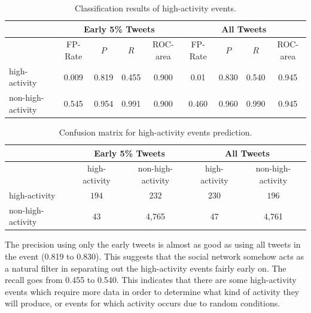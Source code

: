 \begin{table}
  \centering
  {\small
    \begin{tabularx}{\textwidth}{lcccc|cccc}
      \toprule
      & \multicolumn{4}{c}{\textbf{Early 5\% Tweets}} & \multicolumn{4}{c}{\textbf{All Tweets}} \\
      \midrule
      & FP-Rate & $P$ & $R$ & ROC-area & FP-Rate & $P$ & $R$ & ROC-area \\
      high-activity & 0.009 & 0.819 & 0.455 & 0.900 & 0.01 & 0.830 & 0.540 & 0.945 \\
      non-high-activity & 0.545 & 0.954 & 0.991 & 0.900 &  0.460 & 0.960 & 0.990 & 0.945 \\
      \bottomrule
    \end{tabularx}
  }
  \caption{{Classification results of high-activity events.}}
  \label{tab:classification_results}
\end{table}

\begin{table}
  \centering
  \begin{tabularx}{\textwidth}{lcc|cc}
    \toprule
    \multirow{2}{*}{ }& \multicolumn{2}{c}{\textbf{Early 5\% Tweets}} & \multicolumn{2}{c}{\textbf{All Tweets}} \\
    \midrule
    & high-activity & non-high-activity & high-activity & non-high-activity \\
    high-activity & $194$ & $232$ & $230$ & $196$\\
    non-high-activity & $43$ & 4,765 & 47 & 4,761 \\
    \bottomrule
  \end{tabularx}
  \caption{{Confusion matrix for high-activity events prediction.}}
  \label{tab:confusion_matrix}
\end{table}



The precision using only the early tweets is almost as good as using all tweets
in the event (0.819 to 0.830). 
%
This suggests that the social network somehow acts as a natural filter in
separating out the high-activity events fairly early on.  
%
The recall goes from 0.455 to 0.540. 
%
This indicates that there are some high-activity events which require more data
in order to determine what kind of activity they will produce, or events for
which activity occurs due to random conditions. 



